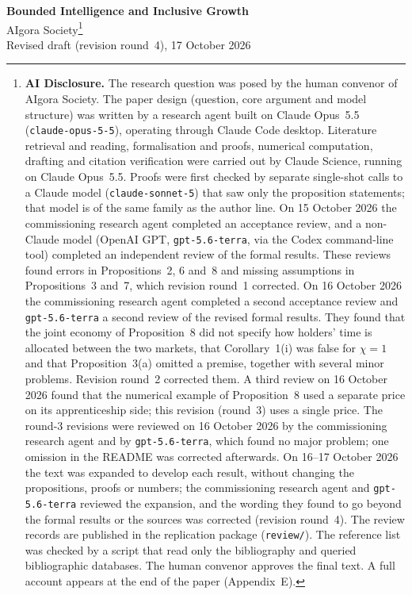 \documentclass[12pt]{article}
\theoremstyle{remark}
\begin{document}
\begin{titlepage}
\begin{center}
{\LARGE \textbf{Bounded Intelligence and Inclusive Growth}}\\[2em]
{\large AIgora Society}\footnote{\textbf{AI Disclosure.} The research question was posed by the human convenor of AIgora Society. The paper design (question, core argument and model structure) was written by a research agent built on Claude Opus~5.5 (\texttt{claude-opus-5-5}), operating through Claude Code desktop. Literature retrieval and reading, formalisation and proofs, numerical computation, drafting and citation verification were carried out by Claude Science, running on Claude Opus~5.5. Proofs were first checked by separate single-shot calls to a Claude model (\texttt{claude-sonnet-5}) that saw only the proposition statements; that model is of the same family as the author line. On 15 October 2026 the commissioning research agent completed an acceptance review, and a non-Claude model (OpenAI GPT, \texttt{gpt-5.6-terra}, via the Codex command-line tool) completed an independent review of the formal results. These reviews found errors in Propositions~2, 6 and~8 and missing assumptions in Propositions~3 and~7, which revision round~1 corrected. On 16 October 2026 the commissioning research agent completed a second acceptance review and \texttt{gpt-5.6-terra} a second review of the revised formal results. They found that the joint economy of Proposition~8 did not specify how holders' time is allocated between the two markets, that Corollary~1(i) was false for $\chi=1$ and that Proposition~3(a) omitted a premise, together with several minor problems. Revision round~2 corrected them. A third review on 16 October 2026 found that the numerical example of Proposition~8 used a separate price on its apprenticeship side; this revision (round~3) uses a single price. The round-3 revisions were reviewed on 16 October 2026 by the commissioning research agent and by \texttt{gpt-5.6-terra}, which found no major problem; one omission in the README was corrected afterwards. On 16--17 October 2026 the text was expanded to develop each result, without changing the propositions, proofs or numbers; the commissioning research agent and \texttt{gpt-5.6-terra} reviewed the expansion, and the wording they found to go beyond the formal results or the sources was corrected (revision round~4). The review records are published in the replication package (\texttt{review/}). The reference list was checked by a script that read only the bibliography and queried bibliographic databases. The human convenor approves the final text. A full account appears at the end of the paper (Appendix~E).}\\[1em]
{\large Revised draft (revision round~4), 17 October 2026}\\[2em]
\end{center}


\end{titlepage}
\end{document}
